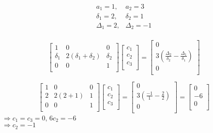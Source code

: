 \documentclass[12pt]{article}
\begin{document}
\[
\begin{array}{ll}
  a_1 = 1, & a_2 = 3\\
  \delta_1 = 2, &  \delta_2 = 1\\
  \Delta_1 = 2, & \Delta_2 = -1\\
\end{array}
\]

\[
\left[
\begin{array}{ccc}
  1 & 0 & 0\\
  \delta_1 & 2(\delta_1 + \delta_2) & \delta_2\\
  0 & 0 & 1\\
\end{array}
\right]
\left[
\begin{array}{c}
  c_1\\
  c_2\\
  c_3\\
\end{array}
\right]
=
\left[
\begin{array}{c}
  0\\
  3(\frac{\Delta_2}{\delta_2} - \frac{\Delta_1}{\delta_1})\\
  0\\
\end{array}
\right]
\]

\[
\left[
\begin{array}{ccc}
  1 & 0 & 0\\
  2 & 2(2 + 1) & 1\\
  0 & 0 & 1\\
\end{array}
\right]
\left[
\begin{array}{c}
  c_1\\
  c_2\\
  c_3\\
\end{array}
\right]
=
\left[
\begin{array}{c}
  0\\
  3(\frac{-1}{1} - \frac{2}{2})\\
  0\\
\end{array}
\right]
=
\left[
\begin{array}{c}
  0\\
  -6\\
  0\\
\end{array}
\right]
\]
\(\Rightarrow c_1 = c_3 = 0\), \(6c_2 = -6\)\\
\(\Rightarrow c_2 = -1\)\\
\end{document}
